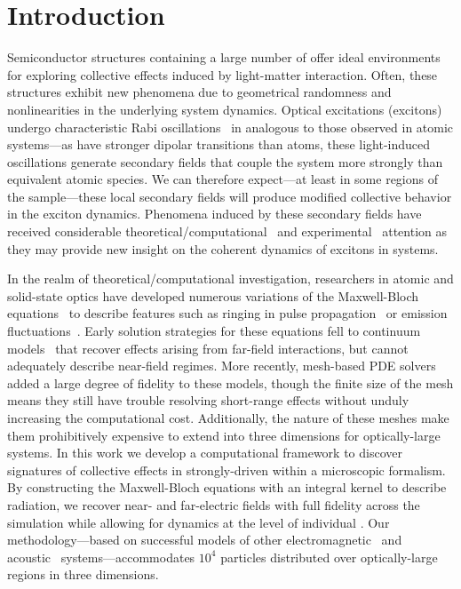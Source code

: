 \section{\label{section:introduction}Introduction}

Semiconductor structures containing a large number of \qds{} offer ideal environments for exploring collective effects induced by light-matter interaction.
Often, these structures exhibit new phenomena due to geometrical randomness and nonlinearities in the underlying system dynamics.
Optical excitations (excitons) undergo characteristic Rabi oscillations~\cite{Stievater2001,Kamada2001,Htoon2002} in \qds{} analogous to those observed in atomic systems---as \qds{} have stronger dipolar transitions than atoms, these light-induced oscillations generate secondary fields that couple the system more strongly than equivalent atomic species.
We can therefore expect---at least in some regions of the sample---these local secondary fields will produce modified collective behavior in the exciton dynamics.
Phenomena induced by these secondary fields have received considerable theoretical/computational~\cite{Slepyan2002,Slepyan2004} and experimental~\cite{Asakura2013} attention as they may provide new insight on the coherent dynamics of excitons in \qd{} systems.

In the realm of theoretical/computational investigation, researchers in atomic and solid-state optics have developed numerous variations of the Maxwell-Bloch equations~\cite{Gross1982} to describe features such as ringing in pulse propagation~\cite{Burnham1969,MacGillivray1976} or emission fluctuations~\cite{Haake1979}.
Early solution strategies for these equations fell to continuum models~\cite{Rehler1971,MacGillivray1976} that recover effects arising from far-field interactions, but cannot adequately describe near-field regimes.
More recently, mesh-based PDE solvers~\cite{Vanneste2001,Fratalocchi2008,Bachelard2015} added a large degree of fidelity to these models, though the finite size of the mesh means they still have trouble resolving short-range effects without unduly increasing the computational cost.
Additionally, the nature of these meshes make them prohibitively expensive to extend into three dimensions for optically-large systems.
In this work we develop a computational framework to discover signatures of collective effects in strongly-driven \qds{} within a microscopic formalism.
By constructing the Maxwell-Bloch equations with an integral kernel to describe radiation, we recover near- and far-electric fields with full fidelity across the simulation while allowing for dynamics at the level of individual \qds{}.
Our methodology---based on successful models of other electromagnetic~\cite{Shanker2000,Pray2012,Pray2014} and acoustic~\cite{Ergin1999a,Ergin1999b,Glosser2016} systems---accommodates $10^4$ particles distributed over optically-large regions in three dimensions.

